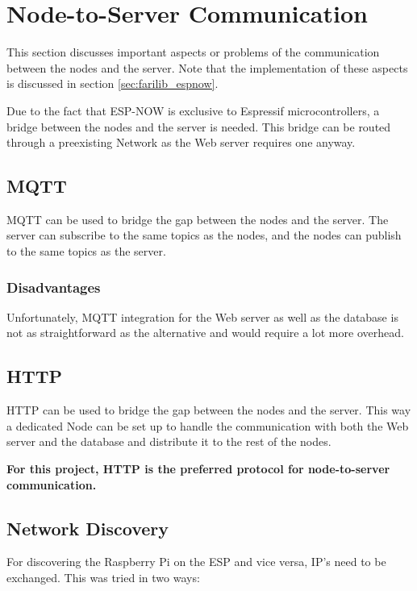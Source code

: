 \section{Node-to-Server Communication}
This section discusses important aspects or problems of the communication between
the nodes and the server. Note that the implementation of these aspects is discussed in section
\ref{sec:farilib_espnow}.

\vspace{0.5cm}

Due to the fact that ESP-NOW is exclusive to Espressif microcontrollers,
a bridge between the nodes and the server is needed. This bridge can be 
routed through a preexisting Network as the Web server requires 
one anyway.


    \subsection{MQTT}
    MQTT can be used to bridge the gap between the nodes and the server.
    The server can subscribe to the same topics as the nodes, and the nodes
    can publish to the same topics as the server.

        \subsubsection{Disadvantages}
        Unfortunately, MQTT integration for the Web server as well as the database
        is not as straightforward as the alternative and would require a lot more 
        overhead.

    \subsection{HTTP}
    HTTP can be used to bridge the gap between the nodes and the server.
    This way a dedicated Node can be set up to handle the communication
    with both the Web server and the database and distribute it to the 
    rest of the nodes.

    \vspace{1cm}
    \textbf{For this project, HTTP is the preferred protocol for 
    node-to-server communication.}

    \subsection{Network Discovery}
    For discovering the Raspberry Pi on the ESP and vice versa,
    IP's need to be exchanged. This was tried in two ways:
